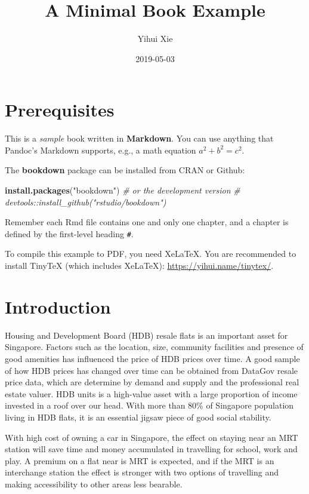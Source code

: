 \documentclass[]{book}
\title{A Minimal Book Example}
\author{Yihui Xie}
\date{2019-05-03}
\newenvironment{Shaded}{\begin{snugshade}}{\end{snugshade}}
\newcommand{\KeywordTok}[1]{\textcolor[rgb]{0.13,0.29,0.53}{\textbf{#1}}}
\newcommand{\StringTok}[1]{\textcolor[rgb]{0.31,0.60,0.02}{#1}}
\newcommand{\CommentTok}[1]{\textcolor[rgb]{0.56,0.35,0.01}{\textit{#1}}}
\newcommand{\NormalTok}[1]{#1}
\begin{document}
\maketitle

{
\setcounter{tocdepth}{1}
\tableofcontents
}
\chapter{Prerequisites}\label{prerequisites}

This is a \emph{sample} book written in \textbf{Markdown}. You can use
anything that Pandoc's Markdown supports, e.g., a math equation
\(a^2 + b^2 = c^2\).

The \textbf{bookdown} package can be installed from CRAN or Github:

\begin{Shaded}
\begin{Highlighting}[]
\KeywordTok{install.packages}\NormalTok{(}\StringTok{"bookdown"}\NormalTok{)}
\CommentTok{# or the development version}
\CommentTok{# devtools::install_github("rstudio/bookdown")}
\end{Highlighting}
\end{Shaded}

Remember each Rmd file contains one and only one chapter, and a chapter
is defined by the first-level heading \texttt{\#}.

To compile this example to PDF, you need XeLaTeX. You are recommended to
install TinyTeX (which includes XeLaTeX):
\url{https://yihui.name/tinytex/}.

\chapter{Introduction}\label{intro}

Housing and Development Board (HDB) resale flats is an important asset
for Singapore. Factors such as the location, size, community facilities
and presence of good amenities has influenced the price of HDB prices
over time. A good sample of how HDB prices has changed over time can be
obtained from DataGov resale price data, which are determine by demand
and supply and the professional real estate valuer. HDB units is a
high-value asset with a large proportion of income invested in a roof
over our head. With more than 80\% of Singapore population living in HDB
flats, it is an essential jigsaw piece of good social stability.

With high cost of owning a car in Singapore, the effect on staying near
an MRT station will save time and money accumulated in travelling for
school, work and play. A premium on a flat near is MRT is expected, and
if the MRT is an interchange station the effect is stronger with two
options of travelling and making accessibility to other areas less
bearable.
\end{document}
